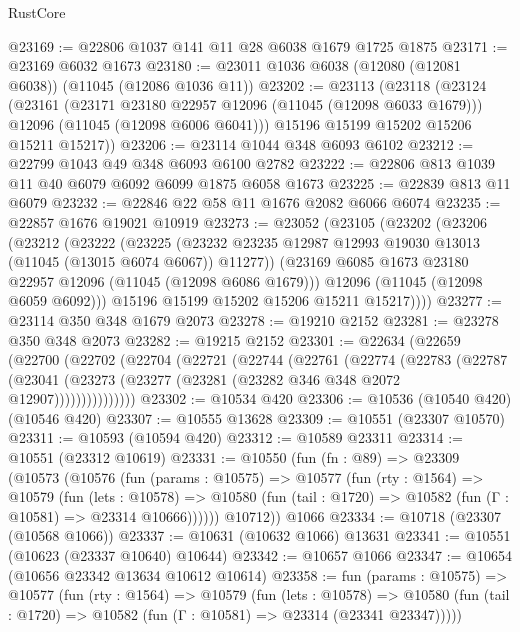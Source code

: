 \begin{lexlean}{RustCore}
\begin{coremodule}
@23169 := @22806 @1037 @141 @11 @28 @6038 @1679 @1725 @1875
@23171 := @23169 @6032 @1673
@23180 := @23011 @1036 @6038 (@12080 (@12081 @6038)) (@11045 (@12086 @1036 @11))
@23202 := @23113
    (@23118
      (@23124
        (@23161
          (@23171 @23180 @22957 @12096 (@11045 (@12098 @6033 @1679)))
          @12096
          (@11045 (@12098 @6006 @6041)))
        @15196
        @15199
        @15202
        @15206
        @15211
        @15217))
@23206 := @23114 @1044 @348 @6093 @6102
@23212 := @22799 @1043 @49 @348 @6093 @6100 @2782
@23222 := @22806 @813 @1039 @11 @40 @6079 @6092 @6099 @1875 @6058 @1673
@23225 := @22839 @813 @11 @6079
@23232 := @22846 @22 @58 @11 @1676 @2082 @6066 @6074
@23235 := @22857 @1676 @19021 @10919
@23273 := @23052
    (@23105
      (@23202
        (@23206
          (@23212
            (@23222
              (@23225
                (@23232 @23235 @12987 @12993 @19030 @13013 (@11045 (@13015 @6074 @6067)) @11277))
              (@23169 @6085 @1673 @23180 @22957 @12096 (@11045 (@12098 @6086 @1679)))
              @12096
              (@11045 (@12098 @6059 @6092)))
            @15196
            @15199
            @15202
            @15206
            @15211
            @15217))))
@23277 := @23114 @350 @348 @1679 @2073
@23278 := @19210 @2152
@23281 := @23278 @350 @348 @2073
@23282 := @19215 @2152
@23301 := @22634
    (@22659
      (@22700
        (@22702
          (@22704
            (@22721
              (@22744
                (@22761
                  (@22774
                    (@22783
                      (@22787
                        (@23041
                          (@23273 (@23277 (@23281 (@23282 @346 @348 @2072 @12907)))))))))))))))
@23302 := @10534 @420
@23306 := @10536 (@10540 @420) (@10546 @420)
@23307 := @10555 @13628
@23309 := @10551 (@23307 @10570)
@23311 := @10593 (@10594 @420)
@23312 := @10589 @23311
@23314 := @10551 (@23312 @10619)
@23331 := @10550
    (fun (fn : @89) =>
    @23309
      (@10573
        (@10576
          (fun (params : @10575) =>
          @10577
            (fun (rty : @1564) =>
            @10579
              (fun (lets : @10578) =>
              @10580 (fun (tail : @1720) => @10582 (fun (Γ : @10581) => @23314 @10666))))))
        @10712))
    @1066
@23334 := @10718 (@23307 (@10568 @1066))
@23337 := @10631 (@10632 @1066) @13631
@23341 := @10551 (@10623 (@23337 @10640) @10644)
@23342 := @10657 @1066
@23347 := @10654 (@10656 @23342 @13634 @10612 @10614)
@23358 := fun (params : @10575) =>
  @10577
    (fun (rty : @1564) =>
    @10579
      (fun (lets : @10578) =>
      @10580 (fun (tail : @1720) => @10582 (fun (Γ : @10581) => @23314 (@23341 @23347)))))

\end{coremodule}
\end{lexlean}
